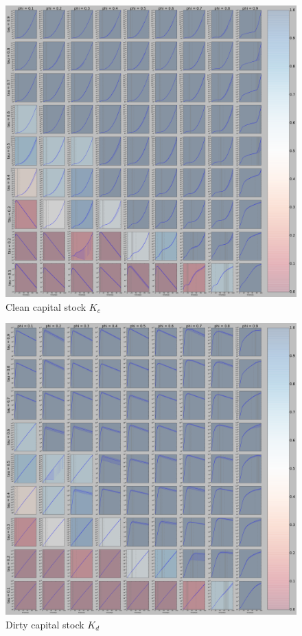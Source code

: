\newpage
\begin{figure}[H]
	\centering
	\includegraphics[width = \linewidth]{figures/K_c'b_r'=1o0.pdf}
	\caption{Clean capital stock $K_c$}
	\label{K_c}
\end{figure}

\begin{figure}[H]
	\centering
	\includegraphics[width = \linewidth]{figures/K_d'b_r'=1o0.pdf}
	\caption{Dirty capital stock $K_d$}
	\label{K_d}
\end{figure}

